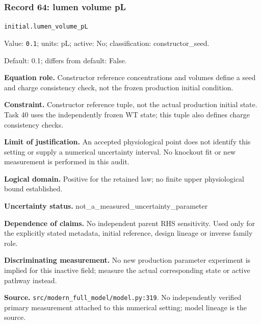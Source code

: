 \subsubsection*{Record 64: lumen volume pL}
{\small \nolinkurl{initial.lumen_volume_pL}\par

Value: \texttt{0.1}; units: pL; active: No; classification: constructor\_seed.\par

Default: 0.1; differs from default: False.\par

\textbf{Equation role.} Constructor reference concentrations and volumes define a seed and charge consistency check, not the frozen production initial condition.\par

\textbf{Constraint.} Constructor reference tuple, not the actual production initial state. Task 40 uses the independently frozen WT state; this tuple also defines charge consistency checks.\par

\textbf{Limit of justification.} An accepted physiological point does not identify this setting or supply a numerical uncertainty interval. No knockout fit or new measurement is performed in this audit.\par

\textbf{Logical domain.} Positive for the retained law; no finite upper physiological bound established.\par

\textbf{Uncertainty status.} not\_a\_measured\_uncertainty\_parameter\par

\textbf{Dependence of claims.} No independent parent RHS sensitivity. Used only for the explicitly stated metadata, initial reference, design lineage or inverse family role.\par

\textbf{Discriminating measurement.} No new production parameter experiment is implied for this inactive field; measure the actual corresponding state or active pathway instead.\par

\textbf{Source.} \nolinkurl{src/modern_full_model/model.py:319}. No independently verified primary measurement attached to this numerical setting; model lineage is the source.\par}

